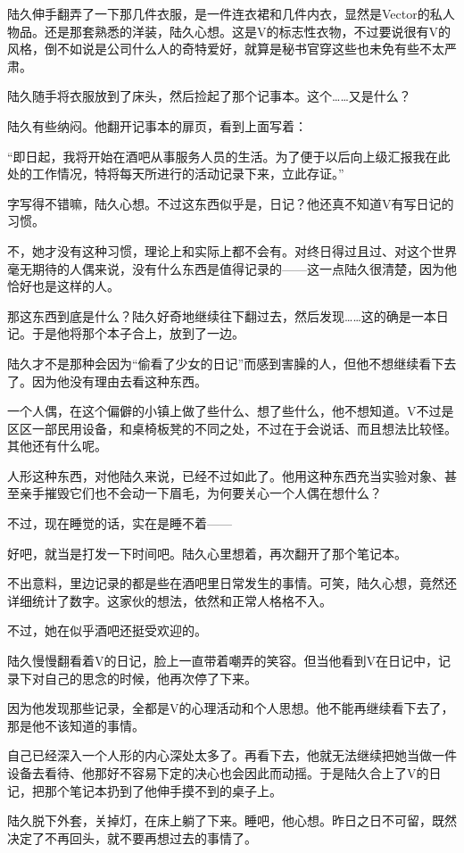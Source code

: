 陆久伸手翻弄了一下那几件衣服，是一件连衣裙和几件内衣，显然是Vector的私人物品。还是那套熟悉的洋装，陆久心想。这是V的标志性衣物，不过要说很有V的风格，倒不如说是公司什么人的奇特爱好，就算是秘书官穿这些也未免有些不太严肃。

陆久随手将衣服放到了床头，然后捡起了那个记事本。这个……又是什么？

陆久有些纳闷。他翻开记事本的扉页，看到上面写着：

“即日起，我将开始在酒吧从事服务人员的生活。为了便于以后向上级汇报我在此处的工作情况，特将每天所进行的活动记录下来，立此存证。”

字写得不错嘛，陆久心想。不过这东西似乎是，日记？他还真不知道V有写日记的习惯。

不，她才没有这种习惯，理论上和实际上都不会有。对终日得过且过、对这个世界毫无期待的人偶来说，没有什么东西是值得记录的——这一点陆久很清楚，因为他恰好也是这样的人。

那这东西到底是什么？陆久好奇地继续往下翻过去，然后发现……这的确是一本日记。于是他将那个本子合上，放到了一边。

陆久才不是那种会因为“偷看了少女的日记”而感到害臊的人，但他不想继续看下去了。因为他没有理由去看这种东西。

一个人偶，在这个偏僻的小镇上做了些什么、想了些什么，他不想知道。V不过是区区一部民用设备，和桌椅板凳的不同之处，不过在于会说话、而且想法比较怪。其他还有什么呢。

人形这种东西，对他陆久来说，已经不过如此了。他用这种东西充当实验对象、甚至亲手摧毁它们也不会动一下眉毛，为何要关心一个人偶在想什么？

不过，现在睡觉的话，实在是睡不着——

好吧，就当是打发一下时间吧。陆久心里想着，再次翻开了那个笔记本。

不出意料，里边记录的都是些在酒吧里日常发生的事情。可笑，陆久心想，竟然还详细统计了数字。这家伙的想法，依然和正常人格格不入。

不过，她在似乎酒吧还挺受欢迎的。

陆久慢慢翻看着V的日记，脸上一直带着嘲弄的笑容。但当他看到V在日记中，记录下对自己的思念的时候，他再次停了下来。

因为他发现那些记录，全都是V的心理活动和个人思想。他不能再继续看下去了，那是他不该知道的事情。

自己已经深入一个人形的内心深处太多了。再看下去，他就无法继续把她当做一件设备去看待、他那好不容易下定的决心也会因此而动摇。于是陆久合上了V的日记，把那个笔记本扔到了他伸手摸不到的桌子上。

陆久脱下外套，关掉灯，在床上躺了下来。睡吧，他心想。昨日之日不可留，既然决定了不再回头，就不要再想过去的事情了。

